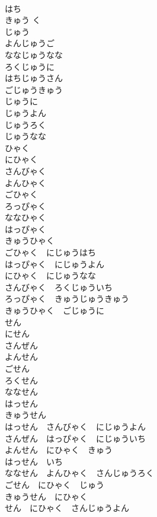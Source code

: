 \documentclass[8pt]{extreport}
\begin{document}
\begin{CJK}{UTF8}{min}
\\	はち	
\\	きゅう く	
\\	じゅう	
\\	よんじゅうご	
\\	ななじゅうなな	
\\	ろくじゅうに	
\\	はちじゅうさん	
\\	ごじゅうきゅう	
\\	じゅうに	
\\	じゅうよん	
\\	じゅうろく	
\\	じゅうなな	
\\	ひゃく	
\\	にひゃく	
\\	さんびゃく	
\\	よんひゃく	
\\	ごひゃく	
\\	ろっぴゃく	
\\	ななひゃく	
\\	はっぴゃく	
\\	きゅうひゃく	
\\	ごひゃく　にじゅうはち	
\\	はっぴゃく　にじゅうよん	
\\	にひゃく　にじゅうなな	
\\	さんびゃく　ろくじゅういち	
\\	ろっぴゃく　きゅうじゅうきゅう	
\\	きゅうひゃく　ごじゅうに	
\\	せん	
\\	にせん	
\\	さんぜん	
\\	よんせん	
\\	ごせん	
\\	ろくせん	
\\	ななせん	
\\	はっせん	
\\	きゅうせん	
\\	はっせん　さんびゃく　にじゅうよん	
\\	さんぜん　はっぴゃく　にじゅういち	
\\	よんせん　にひゃく　きゅう	
\\	はっせん　いち	
\\	ななせん　よんひゃく　さんじゅうろく	
\\	ごせん　にひゃく　じゅう	
\\	きゅうせん　にひゃく	
\\	せん　にひゃく　さんじゅうよん	

\end{CJK}
\end{document}
